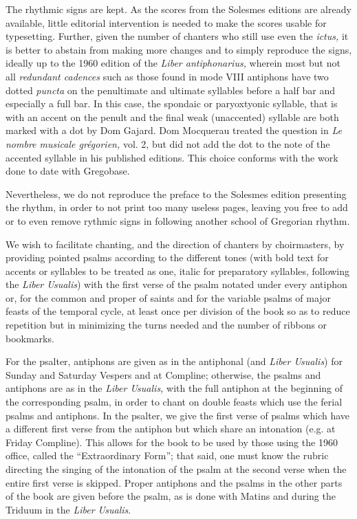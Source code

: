 \begin{enpars}

The rhythmic signs are kept. As the scores from the Solesmes editions are already available, little editorial intervention is needed to make the scores usable for typesetting. Further, given the number of chanters who still use even the \textit{ictus,}  it is better to abstain from making more changes and to simply reproduce the signs, ideally up to the 1960 edition of the \textit{Liber antiphonarius,} wherein most but not all \textit{redundant cadences} such as those found in mode VIII antiphons have two dotted \textit{puncta} on the penultimate and ultimate syllables before a half bar and especially a full bar. In this case, the spondaic or paryoxtyonic syllable, that is with an accent on the penult and the final weak (unaccented) syllable are both marked with a dot by Dom Gajard. Dom Mocquerau treated the question in \textit{Le nombre musicale grégorien,} vol. 2, but did not add the dot to the note of the accented syllable in his published editions. This choice conforms with the work done to date with Gregobase.

Nevertheless, we do not reproduce the preface to the Solesmes edition presenting the rhythm, in order to not print too many useless pages, leaving you free to add or to even remove rythmic signs in following another school of Gregorian rhythm.

We wish to facilitate chanting, and the direction of chanters by choirmasters, by providing pointed psalms according to the different tones (with bold text for accents or syllables to be treated as one, italic for preparatory syllables, following the \textit{Liber Usualis}) with the first verse of the psalm notated under every antiphon or, for the common and proper of saints and for the variable psalms of major feasts of the temporal cycle, at least once per division of the book so as to reduce repetition but in minimizing the turns needed and the number of ribbons or bookmarks.

For the psalter, antiphons are given as in the antiphonal (and \textit{Liber Usualis}) for Sunday and Saturday Vespers and at Compline; otherwise, the psalms and antiphons are as in the \textit{Liber Usualis,} with the full antiphon at the beginning of the corresponding psalm, in order to chant on double feasts which use the ferial psalms and antiphons. In the psalter, we give the first verse of psalms which have a different first verse from the antiphon but which share an intonation (e.g. at Friday Compline). This allows for the book to be used by those using the 1960 office, called the ``Extraordinary Form''; that said, one must know the rubric directing the singing of the intonation of the psalm at the second verse when the entire first verse is skipped. Proper antiphons and the psalms in the other parts of the book are given before the psalm, as is done with Matins and during the Triduum in the \textit{Liber Usualis}.


\end{enpars}
